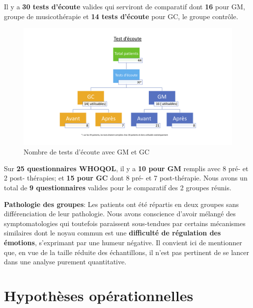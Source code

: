      Il y a\textbf{ 30 tests d'écoute} valides qui serviront de
     comparatif dont \textbf{16} pour
     GM, groupe de musicothérapie et \textbf{14 tests d'écoute} pour GC, le groupe
     contrôle.
      \begin{figure}
\centering
\includegraphics[width=1\linewidth]{images/graphiques/test_ecoute.jpg}
\caption[Schéma du déroulement]{Nombre de tests d'écoute avec GM et GC}
       
\label{groupecontroleimage1}
\end{figure}
Sur \textbf{25 questionnaires WHOQOL}, il y a \textbf{10 pour GM} remplis
avec 8 pré- et  2
     post- thérapies; et \textbf{15 pour GC} dont 8 pré-
     et 7 post-thérapie.
      Nous avons un total de \textbf{9 questionnaires} valides pour le
     comparatif des 2 groupes réunis.
    
\textbf{ Pathologie des groupes}: Les patients ont été répartis en deux groupes sans différenciation de
 leur pathologie. Nous avons conscience d'avoir mélangé des symptomatologies qui
 toutefois paraissent
 sous-tendues par
                                               certains mécanismes
                                               similaires dont le
                                               noyau commun est une
                                              \textbf{difficulté de
                                               régulation des
                                               émotions}, 
                                               s'exprimant par une
                                               humeur négative.
                                               Il convient ici de mentionner que, en vue de la taille réduite des échantillons, il n'est pas
pertinent de se lancer dans une analyse purement
quantitative.

\section{Hypothèses opérationnelles}

